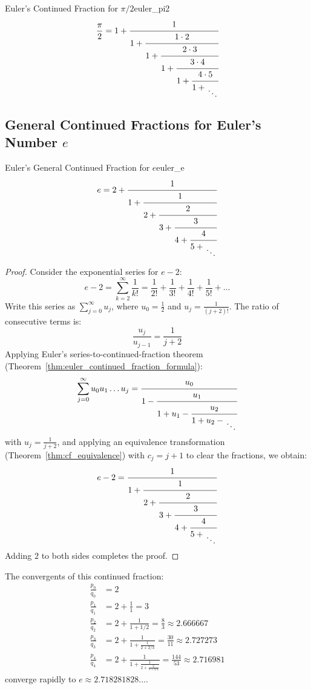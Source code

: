 \documentclass[a4paper]{article}
\begin{document}
\begin{mylemma}{Euler's Continued Fraction for \texorpdfstring{$\pi/2$}{pi/2}}{euler_pi2}
  \[
    \frac{\pi}{2} = 1 + \cfrac{1}{1 + \cfrac{1 \cdot 2}{1 + \cfrac{2 \cdot 3}{1 + \cfrac{3 \cdot 4}{1 + \cfrac{4 \cdot 5}{1 + \CFDots}}}}}
  \]
\end{mylemma}

\subsection{General Continued Fractions for Euler's Number \texorpdfstring{$e$}{e}}\label{cf:subsec:e}

\begin{mylemma}{Euler's General Continued Fraction for \texorpdfstring{$e$}{e}}{euler_e}
  \[
    e = 2 + \cfrac{1}{1 + \cfrac{1}{2 + \cfrac{2}{3 + \cfrac{3}{4 + \cfrac{4}{5 + \CFDots}}}}}
  \]

  \begin{proof}
    Consider the exponential series for $e - 2$:
    \[
      e - 2 = \sum_{k=2}^\infty \frac{1}{k!} = \frac{1}{2!} + \frac{1}{3!} + \frac{1}{4!} + \frac{1}{5!} + \dots
    \]
    Write this series as $\sum_{j=0}^\infty u_j$, where $u_0 = \frac{1}{2}$ and $u_j = \frac{1}{(j+2)!}$.
    The ratio of consecutive terms is:
    \[
      \frac{u_j}{u_{j-1}} = \frac{1}{j+2}
    \]
    Applying Euler's series-to-continued-fraction theorem (Theorem~\ref{thm:euler_continued_fraction_formula}):
    \[
      \sum_{j=0}^\infty u_0 u_1 \dots u_j = \cfrac{u_0}{1 - \cfrac{u_1}{1 + u_1 - \cfrac{u_2}{1 + u_2 - \CFDots}}}
    \]
    with $u_j = \frac{1}{j+2}$, and applying an equivalence transformation (Theorem~\ref{thm:cf_equivalence}) with $c_j = j+1$ to clear the fractions, we obtain:
    \[
      e - 2 = \cfrac{1}{1 + \cfrac{1}{2 + \cfrac{2}{3 + \cfrac{3}{4 + \cfrac{4}{5 + \CFDots}}}}}
    \]
    Adding $2$ to both sides completes the proof.
  \end{proof}
\end{mylemma}

The convergents of this continued fraction:
\begin{align*}
  \frac{p_0}{q_0} & = 2 \\
  \frac{p_1}{q_1} & = 2 + \frac{1}{1} = 3 \\
  \frac{p_2}{q_2} & = 2 + \frac{1}{1 + 1/2} = \frac{8}{3} \approx 2.666667 \\
  \frac{p_3}{q_3} & = 2 + \frac{1}{1 + \frac{1}{2 + 2/3}} = \frac{30}{11} \approx 2.727273 \\
  \frac{p_4}{q_4} & = 2 + \frac{1}{1 + \frac{1}{2 + \frac{2}{3 + 3/4}}} = \frac{144}{53} \approx 2.716981
\end{align*}
converge rapidly to $e \approx 2.718281828\dots$.
\end{document}
